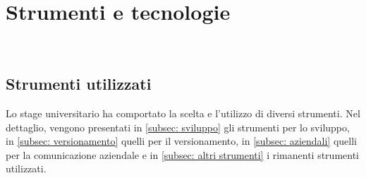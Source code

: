 
\chapter{Strumenti e tecnologie}
\label{cap:strumenti-e-tecnologie}

\\

\section{Strumenti utilizzati}

Lo stage universitario ha comportato la scelta e l'utilizzo di diversi strumenti. Nel dettaglio, vengono presentati in \ref{subsec: sviluppo} gli strumenti per lo sviluppo, in \ref{subsec: versionamento} quelli per il versionamento, in \ref{subsec: aziendali} quelli per la comunicazione aziendale e in \ref{subsec: altri strumenti} i rimanenti strumenti utilizzati.

